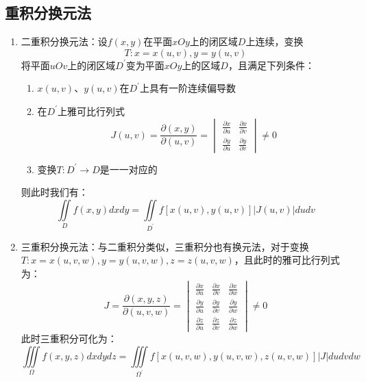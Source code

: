 \documentclass[12pt,a4paper,UTF8]{book}
\begin{document}
\subsection{重积分换元法}
\begin{enumerate}
\item 二重积分换元法：设$f\left(x,y\right)$在平面$xOy$上的闭区域$D$上连续，变换
\[T:x=x\left(u,v\right),y=y\left(u,v\right)\]
将平面$uOv$上的闭区域$D^{\prime}$变为平面$xOy$上的区域$D$，且满足下列条件：
\begin{enumerate}
\item $x\left(u,v\right)$、$y\left(u,v\right)$在$D^{\prime}$上具有一阶连续偏导数
\item 在$D^{\prime}$上雅可比行列式
\[J\left(u,v\right)=\frac{\partial\left(x,y\right)}{\partial\left(u,v\right)}=\begin{vmatrix}\frac{\partial x}{\partial u}&\frac{\partial x}{\partial v}\\\frac{\partial y}{\partial u}&\frac{\partial y}{\partial v}\end{vmatrix}\ne0\]
\item 变换$T:D^{\prime}\to D$是一一对应的
\end{enumerate}
则此时我们有：
\[\iint\limits_{D}f\left(x,y\right)dxdy=\iint\limits_{D^{\prime}}f\left[x\left(u,v\right),y\left(u,v\right)\right]\left|J\left(u,v\right)\right|dudv\]
\item 三重积分换元法：与二重积分类似，三重积分也有换元法，对于变换$T:x=x\left(u,v,w\right),y=y\left(u,v,w\right),z=z\left(u,v,w\right)$，且此时的雅可比行列式为：
\[J=\frac{\partial\left(x,y,z\right)}{\partial\left(u,v,w\right)}=\begin{vmatrix}\frac{\partial x}{\partial u}&\frac{\partial x}{\partial v}&\frac{\partial x}{\partial w}\\\frac{\partial y}{\partial u}&\frac{\partial y}{\partial v}&\frac{\partial y}{\partial w}\\\frac{\partial z}{\partial u}&\frac{\partial z}{\partial v}&\frac{\partial z}{\partial w}\end{vmatrix}\ne0\]
此时三重积分可化为：
\[\iiint\limits_{\Omega}f\left(x,y,z\right)dxdydz=\iiint\limits_{\Omega^{\prime}}f\left[x\left(u,v,w\right),y\left(u,v,w\right),z\left(u,v,w\right)\right]\left|J\right|dudvdw\]
\end{enumerate}
\end{document}
